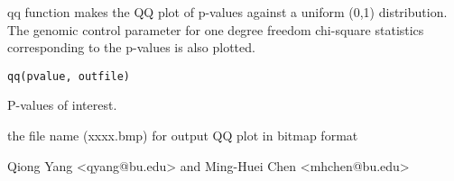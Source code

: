 \begin{Description}\relax
qq function makes the QQ plot of p-values against a uniform (0,1) distribution. 
The genomic control parameter for one degree freedom chi-square statistics corresponding to the p-values is also 
plotted.
\end{Description}
\begin{Usage}
\begin{verbatim}
qq(pvalue, outfile)
\end{verbatim}
\end{Usage}
\begin{Arguments}
\begin{ldescription}
\item[\code{pvalue}] P-values of interest. 
\item[\code{outfile}] the file name (xxxx.bmp) for output QQ plot in bitmap format 
\end{ldescription}
\end{Arguments}
\begin{Author}\relax
Qiong Yang <qyang@bu.edu> and Ming-Huei Chen <mhchen@bu.edu>
\end{Author}

